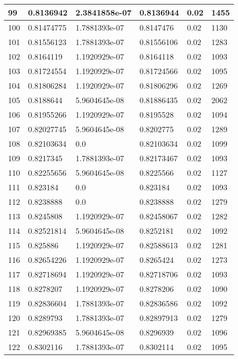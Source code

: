 \begin{longtable}{|l|l|l|l|l|l|}
99 & 0.8136942 & 2.3841858e-07 & 0.8136944 & 0.02 & 1455 \\ \hline 
100 & 0.81474775 & 1.7881393e-07 & 0.8147476 & 0.02 & 1130 \\ \hline 
101 & 0.81556123 & 1.7881393e-07 & 0.81556106 & 0.02 & 1283 \\ \hline 
102 & 0.8164119 & 1.1920929e-07 & 0.8164118 & 0.02 & 1093 \\ \hline 
103 & 0.81724554 & 1.1920929e-07 & 0.81724566 & 0.02 & 1095 \\ \hline 
104 & 0.81806284 & 1.1920929e-07 & 0.81806296 & 0.02 & 1269 \\ \hline 
105 & 0.8188644 & 5.9604645e-08 & 0.81886435 & 0.02 & 2062 \\ \hline 
106 & 0.81955266 & 1.1920929e-07 & 0.8195528 & 0.02 & 1094 \\ \hline 
107 & 0.82027745 & 5.9604645e-08 & 0.8202775 & 0.02 & 1289 \\ \hline 
108 & 0.82103634 & 0.0 & 0.82103634 & 0.02 & 1099 \\ \hline 
109 & 0.8217345 & 1.7881393e-07 & 0.82173467 & 0.02 & 1093 \\ \hline 
110 & 0.82255656 & 5.9604645e-08 & 0.8225566 & 0.02 & 1127 \\ \hline 
111 & 0.823184 & 0.0 & 0.823184 & 0.02 & 1093 \\ \hline 
112 & 0.8238888 & 0.0 & 0.8238888 & 0.02 & 1279 \\ \hline 
113 & 0.8245808 & 1.1920929e-07 & 0.82458067 & 0.02 & 1282 \\ \hline 
114 & 0.82521814 & 5.9604645e-08 & 0.8252181 & 0.02 & 1092 \\ \hline 
115 & 0.825886 & 1.1920929e-07 & 0.82588613 & 0.02 & 1281 \\ \hline 
116 & 0.82654226 & 1.1920929e-07 & 0.8265424 & 0.02 & 1273 \\ \hline 
117 & 0.82718694 & 1.1920929e-07 & 0.82718706 & 0.02 & 1093 \\ \hline 
118 & 0.8278207 & 1.1920929e-07 & 0.8278206 & 0.02 & 1090 \\ \hline 
119 & 0.82836604 & 1.7881393e-07 & 0.82836586 & 0.02 & 1092 \\ \hline 
120 & 0.8289793 & 1.7881393e-07 & 0.82897913 & 0.02 & 1279 \\ \hline 
121 & 0.82969385 & 5.9604645e-08 & 0.8296939 & 0.02 & 1096 \\ \hline 
122 & 0.8302116 & 1.7881393e-07 & 0.8302114 & 0.02 & 1095 \\ \hline 

\end{longtable}
